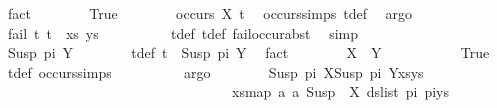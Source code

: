 \begin{isabellebody}
\ fact\isanewline
\ \ \ \ \ \ \isamarkupfalse%
\ True\isanewline
\ \ \ \ \ \ \isamarkupfalse%
\ {\isachardoublequoteopen}occurs\ X\ t{}{\isacharprime}{\kern0pt}{\isachardoublequoteclose}\ \isamarkupfalse%
\ occurs{\isachardot}{\kern0pt}simps{\isacharparenleft}{\kern0pt}{}{\isacharparenright}{\kern0pt}\ t{}{\isacharunderscore}{\kern0pt}def\ \isamarkupfalse%
\ argo\isanewline
\ \ \ \ \ \ \isamarkupfalse%
\ {\isachardoublequoteopen}fail\ {\isacharparenleft}{\kern0pt}{\isacharparenleft}{\kern0pt}t{}{\isacharcomma}{\kern0pt}\ t{}{\isacharparenright}{\kern0pt}\ {\isacharhash}{\kern0pt}\ xs{\isacharcomma}{\kern0pt}\ ys{\isacharparenright}{\kern0pt}{\isachardoublequoteclose}\isanewline
\ \ \ \ \ \ \ \ \isamarkupfalse%
\ t{}{\isacharunderscore}{\kern0pt}def\ t{}{\isacharunderscore}{\kern0pt}def\ fail{\isacharunderscore}{\kern0pt}occur{\isacharunderscore}{\kern0pt}abst\ \isamarkupfalse%
\ simp\isanewline
\ \ \ \ \isamarkupfalse%
\isanewline
\ \ \ \ \ \ \isamarkupfalse%
\ {\isacharparenleft}{\kern0pt}Susp\ pi{\isacharprime}{\kern0pt}\ Y{\isacharparenright}{\kern0pt}\isanewline
\ \ \ \ \ \ \isamarkupfalse%
\ t{}{\isacharunderscore}{\kern0pt}def{\isacharcolon}{\kern0pt}\ {\isachardoublequoteopen}t{}\ {\isacharequal}{\kern0pt}\ Susp\ pi{\isacharprime}{\kern0pt}\ Y{\isachardoublequoteclose}\ \isamarkupfalse%
\ fact\isanewline
\ \ \ \ \ \ \isamarkupfalse%
\ {\isachardoublequoteopen}X\ {\isacharequal}{\kern0pt}\ Y{\isachardoublequoteclose}\ \isanewline
\ \ \ \ \ \ \ \ \isamarkupfalse%
\ True\ \isamarkupfalse%
\ t{}{\isacharunderscore}{\kern0pt}def\ occurs{\isachardot}{\kern0pt}simps{\isacharparenleft}{\kern0pt}{}{\isacharparenright}{\kern0pt}\isanewline
\ \ \ \ \ \ \ \ \isamarkupfalse%
\ argo\isanewline
\ \ \ \ \ \ \isamarkupfalse%
\ {\isachardoublequoteopen}{\isacharparenleft}{\kern0pt}{\isacharparenleft}{\kern0pt}Susp\ pi\ X{\isasymapprox}{\isacharquery}{\kern0pt}Susp\ pi{\isacharprime}{\kern0pt}\ Y{\isacharparenright}{\kern0pt}{\isacharhash}{\kern0pt}xs{\isacharcomma}{\kern0pt}ys{\isacharparenright}{\kern0pt}\ \isanewline
\ \ \ \ \ \ \ \ \ \ \ \ \ \ \ \ \ \ \ \ \ \ \ \ \ \ \ \ \ \ \ \ {\isasymturnstile}{\isacharbrackleft}{\kern0pt}{\isacharbrackright}{\kern0pt}{\isasymleadsto}\ {\isacharparenleft}{\kern0pt}xs{\isacharcomma}{\kern0pt}{\isacharparenleft}{\kern0pt}map\ {\isacharparenleft}{\kern0pt}{\isasymlambda}a{\isachardot}{\kern0pt}\ a{\isasymsharp}{\isacharquery}{\kern0pt}\ Susp\ {\isacharbrackleft}{\kern0pt}{\isacharbrackright}{\kern0pt}\ X{\isacharparenright}{\kern0pt}\ {\isacharparenleft}{\kern0pt}ds{\isacharunderscore}{\kern0pt}list\ pi\ pi{\isacharprime}{\kern0pt}{\isacharparenright}{\kern0pt}{\isacharparenright}{\kern0pt}{\isacharat}{\kern0pt}ys{\isacharparenright}{\kern0pt}{\isachardoublequoteclose}\isanewline

\end{isabellebody}
